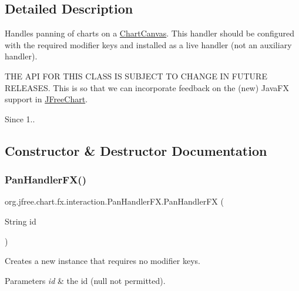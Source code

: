 \subsection{Detailed Description}
Handles panning of charts on a \mbox{\hyperlink{classorg_1_1jfree_1_1chart_1_1fx_1_1_chart_canvas}{Chart\+Canvas}}. This handler should be configured with the required modifier keys and installed as a live handler (not an auxiliary handler).

T\+HE A\+PI F\+OR T\+H\+IS C\+L\+A\+SS IS S\+U\+B\+J\+E\+CT TO C\+H\+A\+N\+GE IN F\+U\+T\+U\+RE R\+E\+L\+E\+A\+S\+ES. This is so that we can incorporate feedback on the (new) Java\+FX support in \mbox{\hyperlink{classorg_1_1jfree_1_1chart_1_1_j_free_chart}{J\+Free\+Chart}}.

\begin{DoxySince}{Since}
1.. 
\end{DoxySince}


\subsection{Constructor \& Destructor Documentation}
\mbox{\label{classorg_1_1jfree_1_1chart_1_1fx_1_1interaction_1_1_pan_handler_f_x_a6bb199810bc8ca8d153e5d10d63716d2}} 
\subsubsection{\texorpdfstring{Pan\+Handler\+F\+X()}{PanHandlerFX()}\hspace{0.1cm}{\footnotesize\ttfamily [1/2]}}
{\footnotesize\ttfamily org.\+jfree.\+chart.\+fx.\+interaction.\+Pan\+Handler\+F\+X.\+Pan\+Handler\+FX (\begin{DoxyParamCaption}\item[{String}]{id }\end{DoxyParamCaption})}

Creates a new instance that requires no modifier keys.


\begin{DoxyParams}{Parameters}
{\em id} & the id ({\ttfamily null} not permitted). \\
\hline
\end{DoxyParams}
\mbox{\label{classorg_1_1jfree_1_1chart_1_1fx_1_1interaction_1_1_pan_handler_f_x_a5ae77a35c253a032f19a1764070415c1}} 
